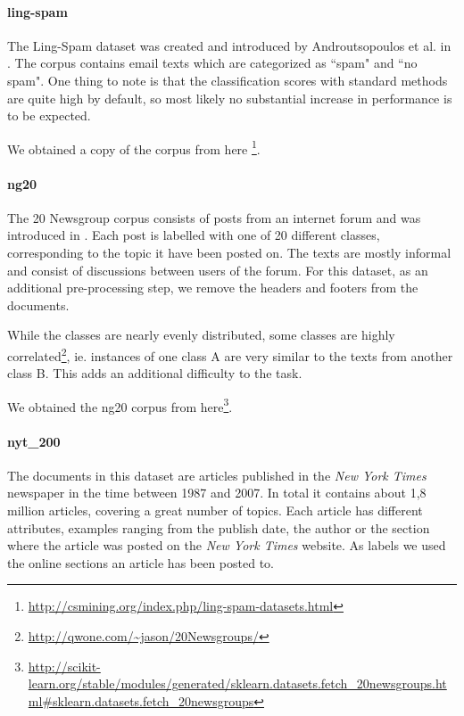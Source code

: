 \paragraph{ling-spam}
The Ling-Spam dataset was created and introduced by Androutsopoulos et al. in  \cite{Androutsopoulos2000}.
The corpus contains email texts which are categorized as ``spam" and ``no spam".
One thing to note is that the classification scores with standard methods are quite high by default, so most likely no substantial increase in performance is to be expected.

We obtained a copy of the corpus from here \footnote{\url{http://csmining.org/index.php/ling-spam-datasets.html}}.


\paragraph{ng20}
The 20 Newsgroup corpus consists of posts from an internet forum and was introduced in \cite{Lang}. Each post is labelled with one of 20 different classes, corresponding to the topic it have been posted on. The texts are mostly informal and consist of discussions between users of the forum.
For this dataset, as an additional pre-processing step, we remove the headers and footers from the documents.

While the classes are nearly evenly distributed, some classes are highly correlated\footnote{\url{http://qwone.com/~jason/20Newsgroups/}}, ie. instances of one class A are very similar to the texts from another class B. This adds an additional difficulty to the task.

We obtained the ng20 corpus from here\footnote{\url{http://scikit-learn.org/stable/modules/generated/sklearn.datasets.fetch\_20newsgroups.html\#sklearn.datasets.fetch_20newsgroups}}.

\paragraph{nyt\_200}
The documents in this dataset are articles published in the \textit{New York Times} newspaper in the time between 1987 and 2007.
In total it contains about 1,8 million articles, covering a great number of topics.
Each article has different attributes, examples ranging from the publish date, the author or the section where the article was posted on the \textit{New York Times} website.
As labels we used the online sections an article has been posted to.

